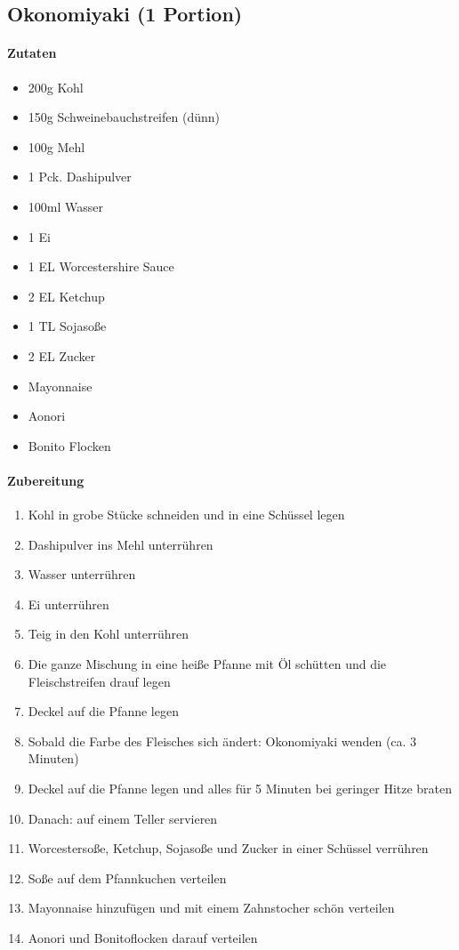 \newpage
\subsection{Okonomiyaki (1 Portion)}
\paragraph{Zutaten}
\begin{itemize}[noitemsep]
	\item 200g Kohl
	\item 150g Schweinebauchstreifen (dünn)
	\item 100g Mehl
	\item 1 Pck. Dashipulver 
	\item 100ml Wasser
	\item 1 Ei
	\vspace{0.5cm}
	\item 1 EL Worcestershire Sauce
	\item 2 EL Ketchup
	\item 1 TL Sojasoße
	\item 2 EL Zucker
	\vspace{0.5cm}
	\item Mayonnaise 
	\item Aonori
	\item Bonito Flocken
\end{itemize}
\paragraph{Zubereitung}
\begin{enumerate}[noitemsep]
	\item Kohl in grobe Stücke schneiden und in eine Schüssel legen
	\item Dashipulver ins Mehl unterrühren
	\item Wasser unterrühren
	\item Ei unterrühren
	\item Teig in den Kohl unterrühren
	\item Die ganze Mischung in eine heiße Pfanne mit Öl schütten und die Fleischstreifen drauf legen 
	\item Deckel auf die Pfanne legen 
	\item Sobald die Farbe des Fleisches sich ändert: Okonomiyaki wenden (ca. 3 Minuten)
	\item Deckel auf die Pfanne legen und alles für 5 Minuten bei geringer Hitze braten
	\item Danach: auf einem Teller servieren
	\item Worcestersoße, Ketchup, Sojasoße und Zucker in einer Schüssel verrühren
	\item Soße auf dem Pfannkuchen verteilen
	\item Mayonnaise hinzufügen und mit einem Zahnstocher schön verteilen
	\item Aonori und Bonitoflocken darauf verteilen
\end{enumerate}
